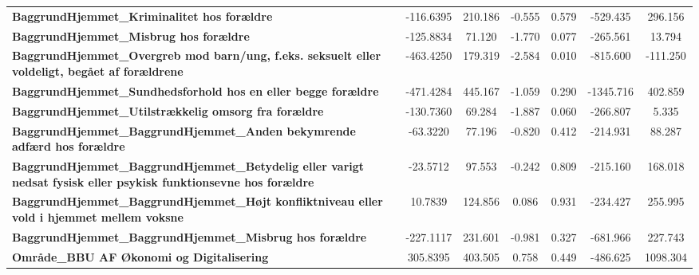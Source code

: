 \begin{center}
\begin{tabular}{lcccccc}
\textbf{BaggrundHjemmet\_Kriminalitet hos forældre}                                                                            &    -116.6395  &      210.186     &    -0.555  &         0.579        &     -529.435    &      296.156     \\
\textbf{BaggrundHjemmet\_Misbrug hos forældre}                                                                                 &    -125.8834  &       71.120     &    -1.770  &         0.077        &     -265.561    &       13.794     \\
\textbf{BaggrundHjemmet\_Overgreb mod barn/ung, f.eks. seksuelt eller voldeligt, begået af forældrene}                         &    -463.4250  &      179.319     &    -2.584  &         0.010        &     -815.600    &     -111.250     \\
\textbf{BaggrundHjemmet\_Sundhedsforhold hos en eller begge forældre}                                                          &    -471.4284  &      445.167     &    -1.059  &         0.290        &    -1345.716    &      402.859     \\
\textbf{BaggrundHjemmet\_Utilstrækkelig omsorg fra forældre}                                                                   &    -130.7360  &       69.284     &    -1.887  &         0.060        &     -266.807    &        5.335     \\
\textbf{BaggrundHjemmet\_BaggrundHjemmet\_Anden bekymrende adfærd hos forældre}                                                &     -63.3220  &       77.196     &    -0.820  &         0.412        &     -214.931    &       88.287     \\
\textbf{BaggrundHjemmet\_BaggrundHjemmet\_Betydelig eller varigt nedsat fysisk eller psykisk funktionsevne hos forældre}       &     -23.5712  &       97.553     &    -0.242  &         0.809        &     -215.160    &      168.018     \\
\textbf{BaggrundHjemmet\_BaggrundHjemmet\_Højt konfliktniveau eller vold i hjemmet mellem voksne}                              &      10.7839  &      124.856     &     0.086  &         0.931        &     -234.427    &      255.995     \\
\textbf{BaggrundHjemmet\_BaggrundHjemmet\_Misbrug hos forældre}                                                                &    -227.1117  &      231.601     &    -0.981  &         0.327        &     -681.966    &      227.743     \\
\textbf{Område\_BBU AF Økonomi og Digitalisering}                                                                              &     305.8395  &      403.505     &     0.758  &         0.449        &     -486.625    &     1098.304     \\

\end{tabular}
\end{center}
